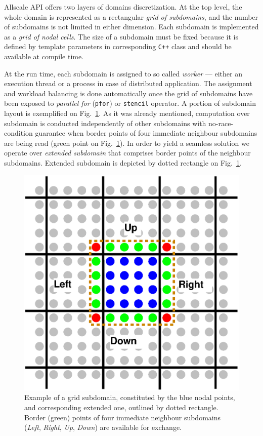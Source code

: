 \documentclass[acmsmall,review,anonymous]{acmart}\settopmatter{printfolios=true,printccs=false,printacmref=false}
\begin{document}
Allscale API offers two layers of domains discretization. At the top level, the whole domain is represented as a rectangular \textit{grid of subdomains}, and the number of subdomains is not limited in either dimension. Each subdomain is implemented as a \textit{grid of nodal cells}. The size of a subdomain must be fixed because it is defined by template parameters in corresponding \texttt{C++} class and should be available at compile time.

At the run time, each subdomain is assigned to so called \textit{worker} --- either an execution thread or a process in case of distributed application. The assignment and workload balancing is done automatically once the grid of subdomains have been exposed to \textit{parallel for} (\texttt{pfor}) or \texttt{stencil} operator. A portion of subdomain layout is exemplified on Fig.~\ref{fig:cell}. As it was already mentioned, computation over subdomain is conducted independently of other subdomains with no-race-condition guarantee when border points of four immediate neighbour subdomains are being read (green point on Fig.~\ref{fig:cell}). In order to yield a seamless solution we operate over \textit{extended subdomain} that comprises border points of the neighbour subdomains. Extended subdomain is depicted by dotted rectangle on Fig.~\ref{fig:cell}. 

\begin{figure}[!htb]
\includegraphics[scale=0.33]{images/subdomain}
\caption{Example of a grid subdomain, constituted by the blue nodal points, and corresponding extended one, outlined by dotted rectangle. Border (green) points of four immediate neighbour subdomains (\textit{Left}, \textit{Right}, \textit{Up}, \textit{Down}) are available for exchange.}
\label{fig:cell}
\end{figure}
\end{document}
